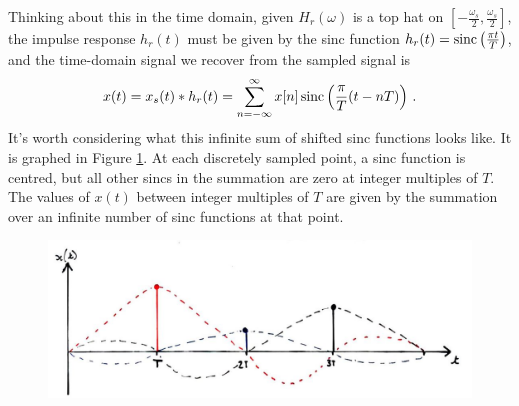 Thinking about this in the time domain, given $H_r(\omega)$ is a top hat on
$\left[-\frac{\omega_s}{2},\frac{\omega_s}{2}\right]$, the impulse response
$h_r(t)$ must be given by the sinc function
$h_r(t) = \operatorname{sinc}\left(\frac{\pi t}{T}\right)$, and the time-domain signal
we recover from the sampled signal is
%
\begin{displaymath}
  x(t) = x_s(t)*h_r(t) = \sum_{n=-\infty}^\infty x[n]\operatorname{sinc}\left(\frac{\pi}{T}(t - nT)\right) \,.
\end{displaymath}
%
It's worth considering what this infinite sum of shifted sinc functions looks
like. It is graphed in Figure \ref{fig::lecture_13_sincs}.
At each discretely sampled point, a sinc
function is centred, but all other sincs in the summation are zero at integer
multiples of $T$. The values of $x(t)$ between integer multiples of $T$ are
given by the summation over an infinite number of sinc functions at that point.
%
\begin{figure}[!htb]
  \includegraphics[width=\textwidth]{images/lecture_13_sincs.JPG}
  \caption{
  }
  \label{fig::lecture_13_sincs}
\end{figure}
%
